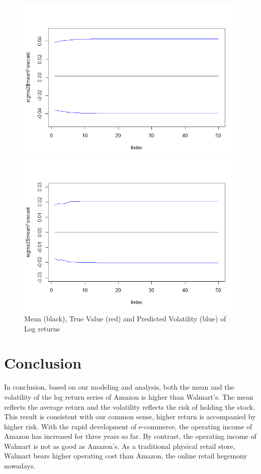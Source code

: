 \documentclass[paper=a4, fontsize=11pt]{article}
\begin{document}
\begin{figure}[!htbp]
\begin{minipage}[!htbp]{0.5\linewidth}
\centering
\includegraphics[scale = 0.45]{img/predict_AMZN}
\end{minipage}
\begin{minipage}[!htbp]{0.5\linewidth}
\centering
\includegraphics[scale = 0.45]{img/predict_WMT}
\end{minipage}
\caption{Mean (black), True Value (red) and Predicted Volatility (blue) of Log returns}
\label{predict}
\end{figure}

\section{Conclusion}
In conclusion, based on our modeling and analysis, both the mean and the volatility of the log return series of Amazon is higher than Walmart’s. The mean reflects the average return and the volatility reflects the risk of holding the stock. This result is consistent with our common sense, higher return is accompanied by higher risk. 
With the rapid development of e-commerce, the operating income of Amazon has increased for three years so far. By contrast, the operating income of Walmart is not as good as Amazon’s. As a traditional physical retail store, Walmart bears higher operating cost than Amazon, the online retail hegemony nowadays. 
\end{document}
